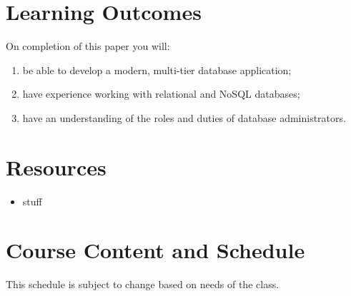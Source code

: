 \documentclass{article}
\begin{document}
\section*{Learning Outcomes}
On completion of this paper you will:
\begin{enumerate}
  \item be able to develop a modern, multi-tier database application;
  \item have experience working with relational and NoSQL databases;
  \item have an understanding of the roles and duties of database administrators.
\end{enumerate}

\section*{Resources}
\begin{itemize}
 \item stuff
\end{itemize}


\section*{Course Content and Schedule}
This schedule is subject to change based on needs of the class.
\end{document}
